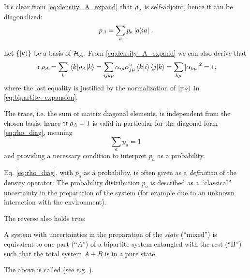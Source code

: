 It's clear from \eqref{eq:density_A_expand} that $\rho_A$ is self-adjoint,
hence it can be diagonalized:
\begin{equation}\label{eq:rho_diag}
  \rho_A = \sum_a p_a \ketbra{a}{a} \text{.}
\end{equation}

Let $\left\{\ket{k}\right\}$ be a basis of $\mathcal{H}_A$.
From \eqref{eq:density_A_expand} we can also derive that
\begin{equation}
  \tr\rho_A = \sum_k \mel{k}{\rho_A}{k} =
    \sum_{ijk\mu}\alpha_{i\mu}\alpha_{j\mu}^{*}\braket{k}{i}\braket{j}{k} =
    \sum_{k\mu}\abs{\alpha_{k\mu}}^2 = 1 \text{,}
\end{equation}
where the last equality is justified by the normalization of $\ket{\psi_S}$
in \eqref{eq:bipartite_expansion}.

The trace, i.e. the sum of matrix diagonal elements, is independent
from the chosen basis, hence $\tr\rho_A = 1$ is valid in particular
for the diagonal form \eqref{eq:rho_diag}, meaning
\[
  \sum_a p_a = 1
\]
and providing a necessary condition to interpret $p_a$ as a probability.

Eq. \eqref{eq:rho_diag}, with $p_a$ as a probability, is often
given as a \emph{definition} of the density operator.
The probability distribution ${p_a}$
is described as a ``classical'' uncertainty in the preparation of the system
(for example due to an unknown interaction with the environment).

The reverse also holds true:
\begin{proposition}
A system with uncertainties in the preparation of the \emph{state}
(``mixed'') is equivalent to one part (``$A$'') of a bipartite system
entangled with the rest (``B'') such that the total system
$A+B$ is in a pure state.
\end{proposition}

The above is called  (see e.g. \cite[]{NielsenChuang}).

